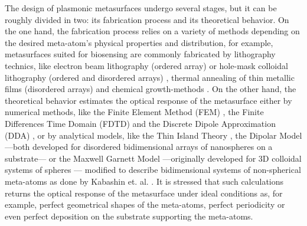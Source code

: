 The design of plasmonic metasurfaces undergo several stages, but it can be roughly divided in two: its fabrication process and its theoretical behavior. On the one hand, the fabrication process relies on a variety of methods depending on the desired meta-atom's physical properties and distribution, for example, metasurfaces suited for biosensing are commonly  fabricated by lithography technics, like electron beam lithography (ordered array) or hole-mask colloidal lithography  (ordered and disordered arrays) \cite{estevez_trends_2014}, thermal annealing of thin metallic films (disordered arrays)  \cite{qiu_dual_2020} and chemical growth-methods \cite{estevez_trends_2014,kabashin_plasmonic_2009}. On the other hand, the theoretical behavior estimates the optical response of the metasurface either by numerical methods, like the Finite Element Method (FEM) \cite{feuz_improving_2010}, the Finite Differences Time Domain (FDTD) \cite{qiu_differential_2015} and the Discrete Dipole Approximation (DDA) \cite{meng_anisotropic_2015}, or by analytical models, like the Thin Island Theory \cite{svedendahl_refractometric_2014,bedeaux_optical_2004}, the Dipolar Model \cite{barrera1991optical} ---both developed for disordered bidimensional arrays of nanospheres on a substrate--- or the Maxwell Garnett Model ---originally developed for 3D colloidal systems of spheres \cite{sihvola_electromagnetic_2008}--- modified to describe bidimensional systems of non-spherical meta-atoms \cite{oates_characterization_2011} as done by Kabashin et. al. \cite{kabashin_plasmonic_2009}. It is stressed that such calculations returns the optical response of the metasurface under ideal conditions as, for example, perfect geometrical shapes of the meta-atoms, perfect periodicity or even perfect deposition on the substrate supporting the meta-atoms.

